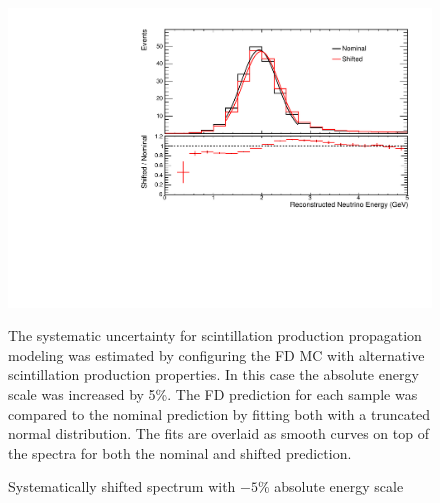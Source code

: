 {\begin{figure}
\begin{center}
\includegraphics[width=\textwidth]{figures/systs/params/fd_flat105cal.pdf}
\end{center}
\caption{Systematically shifted spectrum with $-5$\% absolute energy scale}{
The systematic uncertainty for scintillation production propagation modeling
was estimated by configuring the FD MC with alternative
scintillation production properties.
In this case the absolute energy scale was increased by 5\%.
The FD prediction for each sample was compared to the nominal prediction
by fitting both with a truncated normal distribution.
The fits are overlaid as smooth curves on top of the spectra for both
the nominal and shifted prediction.
}
\label{syst_param_flat105cal}
\end{figure}


}
